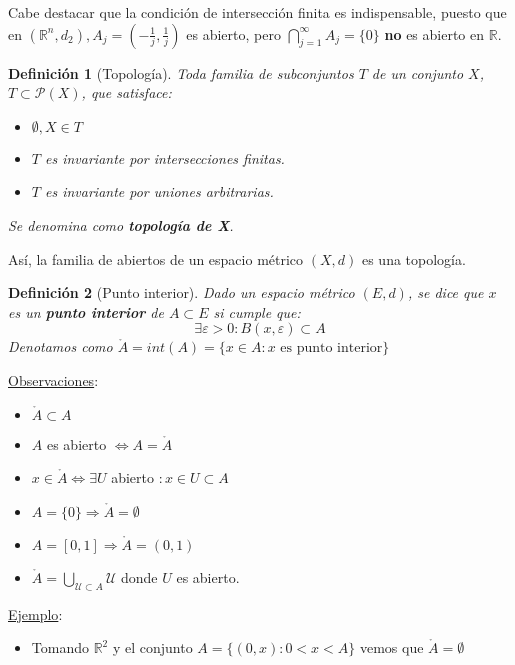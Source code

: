 \documentclass[10pt,a4paper,openright]{book}
\theoremstyle{break}
\newtheorem*{defi}{Definición}
\begin{document}
Cabe destacar que la condición de intersección finita es indispensable, puesto que en $(\mathbb{R}^n, d_2), A_j=\left(-\frac{1}{j}, \frac{1}{j}\right)$ es abierto, pero $\displaystyle\bigcap_{j=1}^\infty A_j = \{0\}$  \textbf{no} es abierto en $\mathbb{R}$.

\begin{defi}[Topología]
Toda familia de subconjuntos $T$ de un conjunto $X$, $T \subset \mathcal P (X)$, que satisface:
\begin{itemize}
\item $\emptyset, X \in T$

\item $T$ es invariante por intersecciones finitas.

\item $T$ es invariante por uniones arbitrarias.
\end{itemize}

Se denomina como \textbf{topología de X}.
\end{defi}

 Así, la familia de abiertos de un espacio métrico $(X,d)$ es una topología.

\begin{defi}[Punto interior]
Dado un espacio métrico $(E,d)$, se dice que $x$ es un \textbf{punto interior} de $A \subset E$ si cumple que:
$$\exists \varepsilon > 0 : B(x, \varepsilon) \subset A$$
Denotamos como $\mathring{A} = int(A) = \{x \in A : x \mbox{ es punto interior}\}$
\end{defi}

\underline{Observaciones}:
\begin{itemize}
\item $\mathring{A} \subset A$
\item $A$ es abierto $\Leftrightarrow A = \mathring{A}$
\item $x \in \mathring{A} \Leftrightarrow \exists U$ abierto $: x \in U \subset A$
\item $A=\{0\}\Rightarrow \mathring{A} = \emptyset$
\item $A = [0,1]\Rightarrow\mathring{A} = (0,1)$
\item $\mathring{A} = \bigcup_{\mathcal{U} \subset A} \mathcal{U}$ donde $U$ es abierto.
\end{itemize}

\underline{Ejemplo}:
\begin{itemize}
\item Tomando $\mathbb{R}^{2}$ y el conjunto $A =\{(0,x): 0 < x < A\}$ vemos que $\mathring{A} = \emptyset$
\end{itemize}
\end{document}
